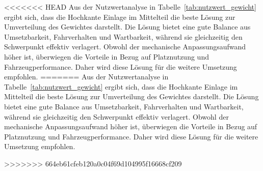 <<<<<<< HEAD
Aus der Nutzwertanalyse in Tabelle~\ref{tab:nutzwert_gewicht} ergibt sich, dass die Hochkante Einlage im Mittelteil die beste Lösung zur Umverteilung des Gewichtes darstellt. Die Lösung bietet eine gute Balance aus Umsetzbarkeit, Fahrverhalten und Wartbarkeit, während sie gleichzeitig den Schwerpunkt effektiv verlagert. Obwohl der mechanische Anpassungsaufwand höher ist, überwiegen die Vorteile in Bezug auf Platznutzung und Fahrzeugperformance. Daher wird diese Lösung für die weitere Umsetzung empfohlen.
=======
Aus der Nutzwertanalyse in Tabelle~\ref{tab:nutzwert_gewicht} ergibt sich, dass die Hochkante Einlage im Mittelteil die beste Lösung zur Umverteilung des Gewichtes darstellt. Die Lösung bietet eine gute Balance aus Umsetzbarkeit, Fahrverhalten und Wartbarkeit, während sie gleichzeitig den Schwerpunkt effektiv verlagert. Obwohl der mechanische Anpassungsaufwand höher ist, überwiegen die Vorteile in Bezug auf Platznutzung und Fahrzeugperformance. Daher wird diese Lösung für die weitere Umsetzung empfohlen. 

\newpage
>>>>>>> 664eb61cfeb120a0c04f69d104995f16668cf209
